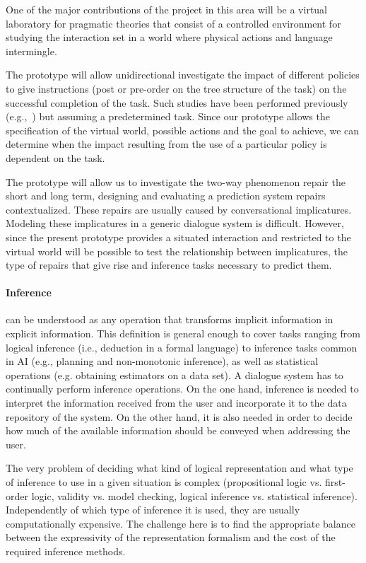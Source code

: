 One of the major contributions of the project in this area will be a virtual 
laboratory for pragmatic theories that consist of a controlled environment 
for studying the
interaction set in a world where physical actions and language intermingle.

The prototype will allow unidirectional investigate the impact of different
policies to give instructions (post or pre-order on the tree structure of the task)
on the successful completion of the task. Such studies have been performed
previously (e.g.,~\cite{foster-etal-ijcai2009}) but assuming a predetermined
task. Since our prototype allows the specification of the virtual world,
possible actions and the goal to achieve, we can determine when the impact
resulting from the use of a particular policy is dependent on the task.

The prototype will allow us to investigate the two-way phenomenon repair the
short and long term, designing and evaluating a prediction system repairs
contextualized. These repairs are usually caused by conversational implicatures.
Modeling these implicatures in a generic dialogue system is difficult. However,
since the present prototype provides a situated interaction and restricted to
the virtual world will be possible to test the relationship between
implicatures, the type of repairs that give rise and inference tasks necessary
to predict them. 

\paragraph{Inference} can be understood as any operation that
transforms implicit information in explicit information. This definition is
general enough to cover tasks ranging from logical inference (i.e., deduction in
a formal language) to inference tasks common in AI (e.g., planning and
non-monotonic inference), as well as statistical operations (e.g. obtaining
estimators on a data set). A dialogue system has to
continually perform inference operations. On the one hand, inference is needed
to interpret the information received from the user and incorporate it to 
the data repository of the system. On the other hand, it is also needed in order 
to decide how much of the
available information should be conveyed when addressing the user.

The very problem of deciding what kind of logical representation and what type
of inference to use in a given situation is complex (propositional logic vs.
first-order logic, validity vs. model checking, logical inference vs.
statistical inference). Independently of which type of inference it is used, they are usually computationally expensive. The challenge here is to find the appropriate
balance between the expressivity of the representation formalism and the
cost of the required inference methods.

